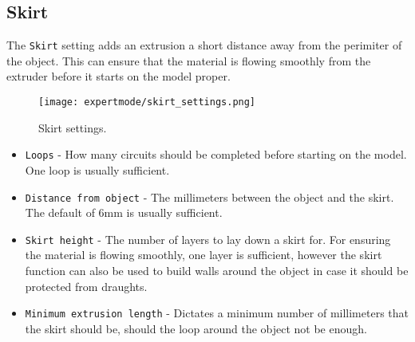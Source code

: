 
\subsection{Skirt} %
\label{sec:skirt}

The \texttt{Skirt} setting adds an extrusion a short distance away from the perimiter of the object.  This can ensure that the material is flowing smoothly from the extruder before it starts on the model proper.

\begin{figure}[H]
\centering
\texttt{[image: expertmode/skirt\_settings.png]}
\caption{Skirt settings.}
\label{fig:skirt_settings}
\end{figure}

\begin{itemize}
    \item \texttt{Loops} - How many circuits should be completed before starting on the model.  One loop is usually sufficient.
    \item \texttt{Distance from object} - The millimeters between the object and the skirt.  The default of 6mm is usually sufficient.
    \item \texttt{Skirt height} - The number of layers to lay down a skirt for.  For ensuring the material is flowing smoothly, one layer is sufficient, however the skirt function can also be used to build walls around the object in case it should be protected from draughts.
    \item \texttt{Minimum extrusion length} - Dictates a minimum number of millimeters that the skirt should be, should the loop around the object not be enough.
\end{itemize}

